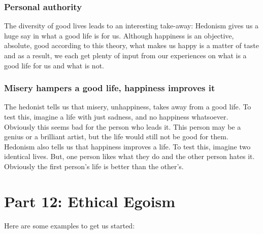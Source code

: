 \subsection{Personal authority}

The diversity of good lives leads to an interesting take-away: Hedonism gives us a huge say in what a good life is for us. Although happiness is an objective, absolute, good according to this theory, what makes us happy is a matter of taste and as a result, we each get plenty of input from our experiences on what is a good life for us and what is not.
\subsection{Misery hampers a good life, happiness improves it}

The hedonist tells us that misery, unhappiness, takes away from a good life. To test this, imagine a life with just sadness, and no happiness whatsoever. Obviously this seems bad for the person who leads it. This person may be a genius or a brilliant artist, but the life would still not be good for them. Hedonism also tells us that happiness improves a life. To test this, imagine two identical lives. But, one person likes what they do and the other person hates it. Obviously the first person’s life is better than the other’s.

\chapter{Part 12: Ethical Egoism}

Here are some examples to get us started:





